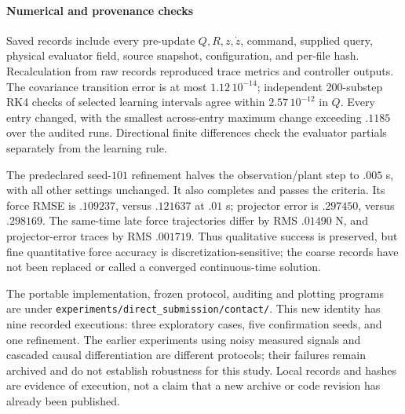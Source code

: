 \paragraph{Numerical and provenance checks}
Saved records include every pre-update $Q,R,z,\dot z$, command, supplied query,
physical evaluator field, source snapshot, configuration, and per-file hash.
Recalculation from raw records reproduced trace metrics and controller outputs.
The covariance transition error is at most $1.12\,10^{-14}$; independent
200-substep RK4 checks of selected learning intervals agree within
$2.57\,10^{-12}$ in $Q$. Every entry changed, with the smallest across-entry
maximum change exceeding $.1185$ over the audited runs. Directional finite
differences check the evaluator partials separately from the learning rule.

The predeclared seed-$101$ refinement halves the observation/plant step to
$.005$ s, with all other settings unchanged. It also completes and passes the
criteria. Its force RMSE is $.109237$, versus $.121637$ at $.01$ s; projector
error is $.297450$, versus $.298169$. The same-time late force trajectories
differ by RMS $.01490$ N, and projector-error traces by RMS $.001719$.
Thus qualitative success is preserved, but fine quantitative force accuracy
is discretization-sensitive; the coarse records have not been replaced or
called a converged continuous-time solution.

The portable implementation, frozen protocol, auditing and plotting programs
are under \texttt{experiments/direct\_submission/contact/}. This new identity
has nine recorded executions: three exploratory cases, five confirmation
seeds, and one refinement. The earlier experiments using noisy measured
signals and cascaded causal differentiation are different protocols; their
failures remain archived and do not establish robustness for this study.
Local records and hashes are evidence of execution,
not a claim that a new archive or code revision has already been published.

